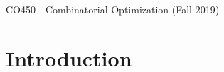 \documentclass[12pt]{article}
\theoremstyle{definition}
\theoremstyle{remark}
\numberwithin{equation}{section}
\begin{document}
\begin{center}
    \Large CO450 - Combinatorial Optimization (Fall 2019)
\end{center}

\tableofcontents

\section{Introduction}

\end{document}
